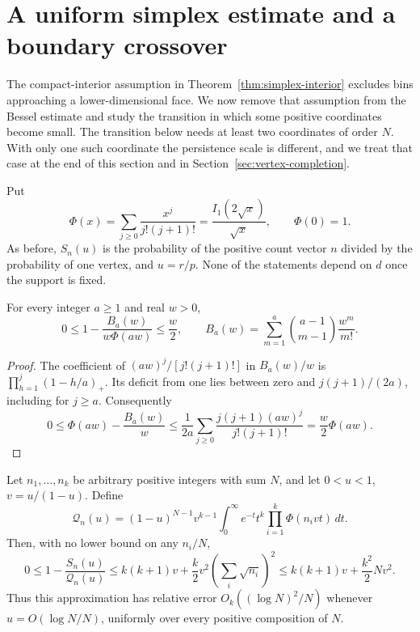\section{A uniform simplex estimate and a boundary crossover}
\label{sec:frontier-boundary}

The compact-interior assumption in Theorem~\ref{thm:simplex-interior}
excludes bins approaching a lower-dimensional face. We now remove that
assumption from the Bessel estimate and study the transition in which some
positive coordinates become small. The transition below needs at least two
coordinates of order $N$. With only one such coordinate the persistence
scale is different, and we treat that case at the end of this section and
in Section~\ref{sec:vertex-completion}.

Put
\[
\Phi(x)=\sum_{j\ge0}\frac{x^j}{j!(j+1)!}
=\frac{I_1(2\sqrt{x})}{\sqrt{x}},\qquad \Phi(0)=1.
\]
As before, $S_n(u)$ is the probability of the positive count vector $n$
divided by the probability of one vertex, and $u=r/p$. None of the
statements depend on $d$ once the support is fixed.

\begin{lemma}
\label{lem:uniform-laguerre-bessel}
For every integer $a\ge1$ and real $w>0$,
\begin{equation}\label{eq:uniform-laguerre-bessel}
0\le1-\frac{B_a(w)}{w\Phi(aw)}\le\frac w2,
\qquad
B_a(w)=\sum_{m=1}^{a}\binom{a-1}{m-1}\frac{w^m}{m!}.
\end{equation}
\end{lemma}

\begin{proof}
The coefficient of $(aw)^j/[j!(j+1)!]$ in $B_a(w)/w$ is
$\prod_{h=1}^j(1-h/a)_+$. Its deficit from one lies between zero and
$j(j+1)/(2a)$, including for $j\ge a$. Consequently
\[
0\le\Phi(aw)-\frac{B_a(w)}w
\le\frac1{2a}\sum_{j\ge0}\frac{j(j+1)(aw)^j}{j!(j+1)!}
=\frac w2\Phi(aw).
\]
\end{proof}

\begin{theorem}
\label{thm:uniform-simplex-majorant}
Let $n_1,\ldots,n_k$ be arbitrary positive integers with sum $N$, and let
$0<u<1$, $v=u/(1-u)$. Define
\[
\mathcal Q_n(u)=(1-u)^{N-1}v^{k-1}
\int_0^\infty e^{-t}t^k\prod_{i=1}^k\Phi(n_i vt)\,dt.
\]
Then, with no lower bound on any $n_i/N$,
\begin{equation}\label{eq:uniform-simplex-majorant}
0\le1-\frac{S_n(u)}{\mathcal Q_n(u)}
\le k(k+1)v+\frac{k}{2}v^2\left(\sum_i\sqrt{n_i}\right)^2
\le k(k+1)v+\frac{k^2}{2}Nv^2.
\end{equation}
Thus this approximation has relative error $O_k((\log N)^2/N)$ whenever
$u=O(\log N/N)$, uniformly over every positive composition of $N$.
\end{theorem}


